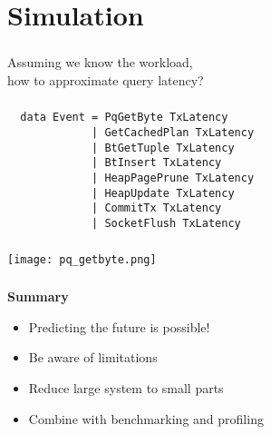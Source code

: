 \documentclass[usenames,dvipsnames, 18pt, compress, aspectratio=169]{beamer}
\begin{document}

\section{Simulation}

\begin{frame}[fragile]{}
    \frametitle{}

    Assuming we know the workload,\\
    how to approximate query latency?
\end{frame}

\begin{frame}[fragile]{}
    \frametitle{}

    \begin{verbatim}
  data Event = PqGetByte TxLatency
             | GetCachedPlan TxLatency
             | BtGetTuple TxLatency
             | BtInsert TxLatency
             | HeapPagePrune TxLatency
             | HeapUpdate TxLatency
             | CommitTx TxLatency
             | SocketFlush TxLatency
    \end{verbatim}

\end{frame}

\begin{frame}[fragile]{}
    \frametitle{}
    \begin{center}

        \texttt{[image: pq\_getbyte.png]}

    \end{center}
\end{frame}

\begin{frame}[fragile]{}
    \frametitle{}
    \textbf{Summary}
    \begin{itemize}[label={\MVRightarrow }]
        \item Predicting the future is possible!
        \item Be aware of limitations
        \item Reduce large system to small parts
        \item Combine with benchmarking and profiling
    \end{itemize}
\end{frame}
\end{document}
